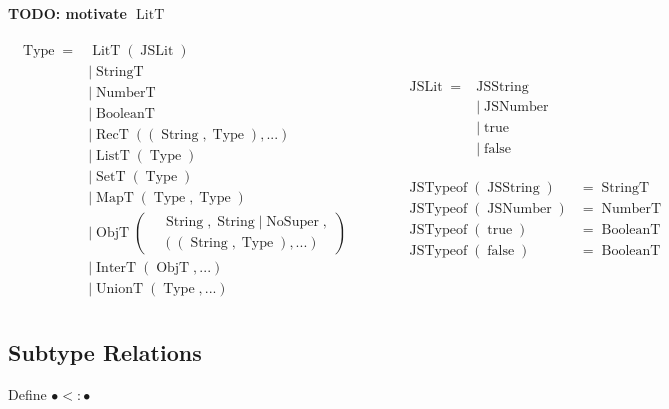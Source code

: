 \documentclass{article}
\DeclareMathOperator{\StringT}{StringT}
\DeclareMathOperator{\NumberT}{NumberT}
\DeclareMathOperator{\BooleanT}{BooleanT}
\DeclareMathOperator{\LitT}{LitT}
\DeclareMathOperator{\JSLit}{JSLit}
\DeclareMathOperator{\JSTypeof}{JSTypeof}
\DeclareMathOperator{\RecT}{RecT}
\DeclareMathOperator{\ObjT}{ObjT}
\DeclareMathOperator{\ListT}{ListT}
\DeclareMathOperator{\SetT}{SetT}
\DeclareMathOperator{\MapT}{MapT}
\DeclareMathOperator{\UnionT}{UnionT}
\DeclareMathOperator{\InterT}{InterT}
\DeclareMathOperator{\String}{String}
\DeclareMathOperator{\Type}{Type}
\DeclareMathOperator{\NoSuper}{NoSuper}
\begin{document}
\textbf{TODO: motivate \(\LitT\)}

\begin{align*}
\begin{aligned}
\Type = &\LitT(\JSLit) \\
&|\StringT \\
&|\NumberT \\
&|\BooleanT \\
&|\RecT((\String, \Type), ...) \\
&|\ListT(\Type) \\
&|\SetT(\Type) \\
&|\MapT(\Type, \Type) \\
&|\ObjT\left(\begin{aligned}
    &\String, \String | \NoSuper, \\
&((\String, \Type), ...)
\end{aligned}\right) \\
&|\InterT(\ObjT, ...) \\
&|\UnionT(\Type, ...)\\
\end{aligned}
\quad\quad\quad\begin{aligned}        
\begin{aligned}
\JSLit = &\operatorname{JSString} \\
&| \operatorname{JSNumber} \\
&| \operatorname{true} \\
&| \operatorname{false} \\
\end{aligned}\\\\
\begin{aligned}
\JSTypeof(\operatorname{JSString}) &= \StringT \\
\JSTypeof(\operatorname{JSNumber}) &= \NumberT \\
\JSTypeof(\operatorname{true}) &= \BooleanT \\
\JSTypeof(\operatorname{false}) &= \BooleanT \\
\end{aligned}  
\end{aligned}  
\end{align*}

\subsection{Subtype Relations}

Define \(\bullet<:\bullet\)
\end{document}
